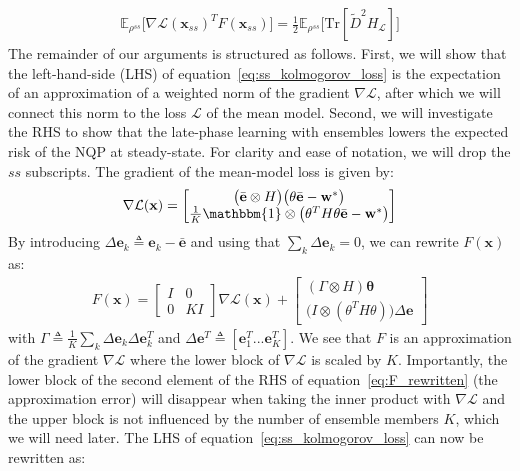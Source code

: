 \documentclass{article} \usepackage{iclr2021_conference,times}
\def\eqref#1{equation~\ref{#1}}
\begin{document}
\begin{align}\label{eq:ss_kolmogorov_loss}
     \mathbb{E}_{\rho^{ss}} \big[\nabla \mathcal{L}(\mathbf{x}_{ss})^T F(\mathbf{x}_{ss})\big] = \frac{1}{2} \mathbb{E}_{\rho^{ss}} \big[\text{Tr}[\tilde{D}^2H_{\mathcal{L}}]\big]
\end{align}
The remainder of our arguments is structured as follows. First, we will show that the left-hand-side (LHS) of \eqref{eq:ss_kolmogorov_loss} is the expectation of an approximation of a weighted norm of the gradient $\nabla \mathcal{L}$, after which we will connect this norm to the loss $\mathcal{L}$ of the mean model. Second, we will investigate the RHS to show that the late-phase learning with ensembles lowers the expected risk of the NQP at steady-state. For clarity and ease of notation, we will drop the $ss$ subscripts. The gradient of the mean-model loss is given by: 
\begin{align}
    \nabla \mathcal{L}(\mathbf{x}) = \begin{bmatrix}
 \big(\bar{\mathbf{e}} \otimes H\big)\big(\theta \bar{\mathbf{e}} - \mathbf{w}^*\big) \\
\frac{1}{K} \mathbbm{1} \otimes \big(\theta^TH\theta \bar{\mathbf{e}} - \mathbf{w}^*\big)
\end{bmatrix}
\end{align}
By introducing $\Delta \mathbf{e}_k \triangleq \mathbf{e}_k - \bar{\mathbf{e}}$ and using that $\sum_k \Delta\mathbf{e}_k = 0$, we can rewrite $F(\mathbf{x})$ as: 
\begin{align} \label{eq:F_rewritten}
    F(\mathbf{x}) = \begin{bmatrix} 
    I & 0 \\ 0 & KI \end{bmatrix} \nabla \mathcal{L}(\mathbf{x}) + 
    \begin{bmatrix}
    (\Gamma \otimes H)\boldsymbol{\theta}\\
    \big(I \otimes ( \theta^T H \theta)\big) \Delta \mathbf{e}
\end{bmatrix}
\end{align}
with $\Gamma \triangleq \frac{1}{K} \sum_k \Delta \mathbf{e}_k\Delta\mathbf{e}_k^T$ and $\Delta \mathbf{e}^T \triangleq [\mathbf{e}_1^T ... \mathbf{e}_K^T]$. We see that $F$ is an approximation of the gradient $\nabla \mathcal{L}$ where the lower block of $\nabla \mathcal{L}$ is scaled by $K$. Importantly, the lower block of the second element of the RHS of \eqref{eq:F_rewritten} (the approximation error) will disappear when taking the inner product with $\nabla \mathcal{L}$ and the upper block is not influenced by the number of ensemble members $K$, which we will need later. The LHS of \eqref{eq:ss_kolmogorov_loss} can now be rewritten as:
\end{document}

